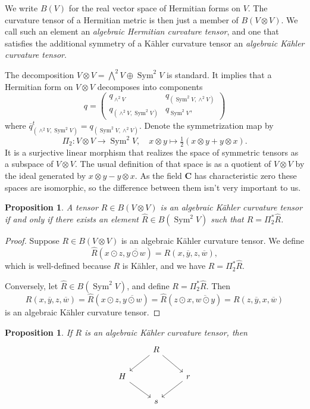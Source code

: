 \documentclass[10pt,a4paper]{amsart}
\newtheorem{prop}[theo]{Proposition}
\theoremstyle{definition}
\def\ov#1{\overline{#1}}
\newcommand{\kk}[1]{\mathbf{#1}}
\DeclareMathOperator{\Sym}{Sym}
\begin{document}
We write $B(V)$ for the real vector space of Hermitian forms on $V$.
The curvature tensor of a Hermitian metric is then just a member of $B(V
\otimes V)$. We call such an element an \emph{algebraic Hermitian curvature
tensor}, and one that satisfies the additional symmetry of a K\"ahler curvature
tensor an \emph{algebraic K\"ahler curvature tensor}.

The decomposition $V \otimes V = \bigwedge^2 V \oplus \Sym^2 V$ is standard.
It implies that a Hermitian form on $V \otimes V$ decomposes into components
$$
q = \begin{pmatrix}
q_{\wedge^2 V} & q_{(\Sym^2V, \wedge^2 V)}
\\
q_{(\wedge^2 V, \Sym^2V)} & q_{\Sym^2 V},
\end{pmatrix}
$$
where $\ov{q}_{(\wedge^2 V, \Sym^2V)}^t = q_{(\Sym^2V, \wedge^2 V)}$.
Denote the symmetrization map by
$$
\Pi_2 : V \otimes V \to \Sym^2 V,
\quad
x \otimes y \mapsto \tfrac 12 (x \otimes y + y \otimes x).
$$
It is a surjective linear morphism that realizes the space of symmetric tensors
as a subspace of $V \otimes V$.
The usual definition of that space is as a quotient of $V \otimes V$ by the
ideal generated by $x \otimes y - y \otimes x$.
As the field $\kk C$ has characteristic zero these spaces are isomorphic,
so the difference between them isn't very important to us.


\begin{prop}
A tensor $R \in B(V \otimes V)$ is an algebraic K\"ahler curvature tensor
if and only if there exists an element $\hat R \in B(\Sym^2 V)$ such that $R =
\Pi_2^* \hat R$.
\end{prop}

\begin{proof}
Suppose $R \in B(V \otimes V)$ is an algebraic K\"ahler curvature tensor.
We define
$$
\hat R(x \odot z, \ov{y \odot w})
= R(x, \ov y, z, \ov w),
$$
which is well-defined because $R$ is K\"ahler, and we have $R = \Pi_2^* \hat R$.

Conversely, let $\hat R \in B(\Sym^2 V)$, and define $R = \Pi_2^* \hat R$.
Then
$$
R(x, \ov y, z, \ov w)
= \hat R(x \odot z, \ov{y \odot w})
= \hat R(z \odot x, \ov{w \odot y})
= R(z, \ov y, x, \ov w)
$$
is an algebraic K\"ahler curvature tensor.
\end{proof}




\begin{prop}
\label{prop:dominance}
If $R$ is an algebraic K\"ahler curvature tensor, then
$$
\begin{tikzcd}
& R \ar[dl] \ar[dr] &
\\
H \ar[dr] & & r \ar[dl]
\\
& s &
\end{tikzcd}
$$
\end{prop}
\end{document}

